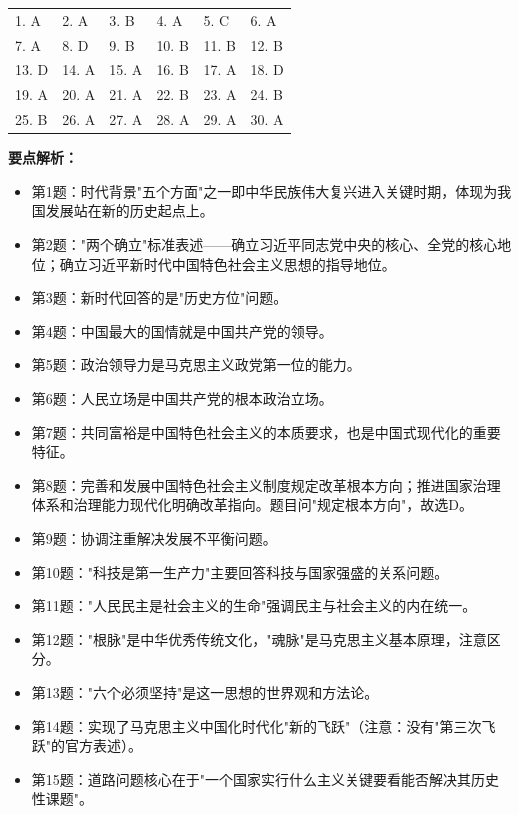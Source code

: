 \documentclass[12pt, a4paper]{article}
\begin{document}
\begin{answerbox}

\begin{tabular}{@{}llllll@{}}
1. A & 2. A & 3. B & 4. A & 5. C & 6. A \\
7. A & 8. D & 9. B & 10. B & 11. B & 12. B \\
13. D & 14. A & 15. A & 16. B & 17. A & 18. D \\
19. A & 20. A & 21. A & 22. B & 23. A & 24. B \\
25. B & 26. A & 27. A & 28. A & 29. A & 30. A \\
\end{tabular}

\vspace{6pt}
\textbf{要点解析：}

\begin{itemize}[leftmargin=2em,itemsep=2pt]
  \item 第1题：时代背景"五个方面"之一即中华民族伟大复兴进入关键时期，体现为我国发展站在新的历史起点上。
  \item 第2题："两个确立"标准表述——确立习近平同志党中央的核心、全党的核心地位；确立习近平新时代中国特色社会主义思想的指导地位。
  \item 第3题：新时代回答的是"历史方位"问题。
  \item 第4题：中国最大的国情就是中国共产党的领导。
  \item 第5题：政治领导力是马克思主义政党第一位的能力。
  \item 第6题：人民立场是中国共产党的根本政治立场。
  \item 第7题：共同富裕是中国特色社会主义的本质要求，也是中国式现代化的重要特征。
  \item 第8题：完善和发展中国特色社会主义制度规定改革根本方向；推进国家治理体系和治理能力现代化明确改革指向。题目问"规定根本方向"，故选D。
  \item 第9题：协调注重解决发展不平衡问题。
  \item 第10题："科技是第一生产力"主要回答科技与国家强盛的关系问题。
  \item 第11题："人民民主是社会主义的生命"强调民主与社会主义的内在统一。
  \item 第12题："根脉"是中华优秀传统文化，"魂脉"是马克思主义基本原理，注意区分。
  \item 第13题："六个必须坚持"是这一思想的世界观和方法论。
  \item 第14题：实现了马克思主义中国化时代化"新的飞跃"（注意：没有"第三次飞跃"的官方表述）。
  \item 第15题：道路问题核心在于"一个国家实行什么主义关键要看能否解决其历史性课题"。

\end{itemize}
\end{answerbox}
\end{document}
